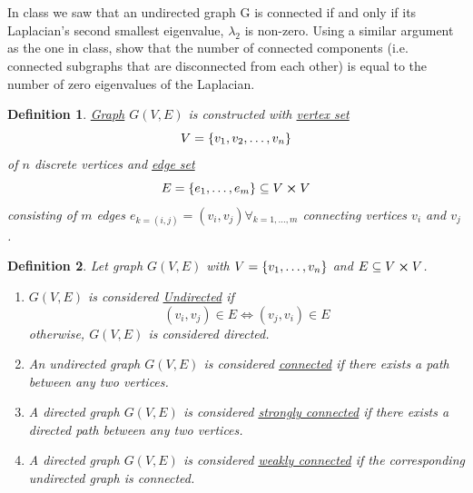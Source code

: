 \documentclass[]{article}
\numberwithin{equation}{section}
\newtheorem{definition}{Definition}
\begin{document}
\section{}
In class we saw that an undirected graph G is connected if and only if its Laplacian’s second smallest eigenvalue, $\lambda_2$ is non-zero. 
Using a similar argument as the one in class, show that the number of connected components (i.e. connected subgraphs that are disconnected from each other) is equal to the number of zero eigenvalues of the Laplacian.

\begin{definition}
	\underline{\emph{Graph}} $G(V,E)$ is constructed with \underline{\emph{vertex set}} \[
		V = \qty{v_1,v_2,\dots,v_n}
	\] of $n$ discrete vertices and \emph{\underline{edge set}} \[
		E = \qty{e_1, \dots, e_m} \subseteq V \cross V
	\] consisting of $m$ edges $e_{k=(i,j)} = (v_i,v_j) \forall_{k=1,\dots,m}$ connecting vertices $v_i$ and $v_j$.
\end{definition}

\begin{definition}
	Let graph $G(V,E)$ with $V = \qty{v_1,\dots,v_n}$ and $E \subseteq V \cross V$.
	\begin{enumerate}
		\item $G(V,E)$ is considered \underline{\emph{Undirected}} if\[
			(v_i,v_j) \in E \iff (v_j,v_i) \in E
		\] otherwise, $G(V,E)$ is considered \emph{directed}.
		\item An undirected graph $G(V,E)$ is considered \underline{\emph{connected}} if there exists a path between any two vertices.
		\item A directed graph $G(V,E)$ is considered \underline{\emph{strongly connected}} if there exists a directed path between any two vertices.
		\item A directed graph $G(V,E)$ is considered \underline{\emph{weakly connected}} if the corresponding undirected graph is connected.
	\end{enumerate}
\end{definition}
\end{document}
